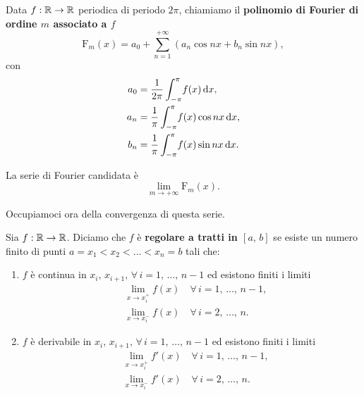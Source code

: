 \documentclass[../../analisi2]{subfiles}
\begin{document}
        \begin{definizione}
            Data \(f : \mathbb{R} \to \mathbb{R}\) periodica di periodo \(2\pi\), chiamiamo il \textbf{polinomio di Fourier di ordine \(m\) associato a
            \(f\)}
            \[
                \mathrm{F}_m (x) = a_0 + \sum_{n = 1}^{+\infty} \left(a_n \cos nx + b_n \sin nx\right),
            \]
            con
            \begin{align*}
                a_0 &= \frac{1}{2\pi} \int_{-\pi}^{\pi} \! f(x) \, \mathrm{d}x,\\
                a_n &= \frac{1}{\pi} \int_{-\pi}^{\pi} \! f(x) \cos nx \, \mathrm{d}x,\\
                b_n &= \frac{1}{\pi} \int_{-\pi}^{\pi} \! f(x) \sin nx \, \mathrm{d}x.
            \end{align*}

            La serie di Fourier candidata è
            \[
                \lim_{m \to +\infty} \mathrm{F}_m (x).
            \]
        \end{definizione}

        Occupiamoci ora della convergenza di questa serie.

        \begin{definizione}
            Sia \(f : \mathbb{R} \to \mathbb{R}\). Diciamo che \(f\) è \textbf{regolare a tratti in \([a, \, b]\)} se esiste un numero finito di punti
            \(a = x_1 < x_2 < \ldots < x_n = b\) tali che:
            \begin{enumerate}
                \item \(f\) è continua in \(x_i, \, x_{i + 1}, \, \forall \, i = 1, \, \ldots, \, n - 1\) ed esistono finiti i limiti
                    \begin{align*}
                        &\lim_{x \to x_i^+} f(x) \quad \forall \, i = 1, \, \ldots, \, n - 1,\\
                        &\lim_{x \to x_i^-} f(x) \quad \forall \, i = 2, \, \ldots, \, n.
                    \end{align*}
                \item \(f\) è derivabile in \(x_i, \, x_{i + 1}, \, \forall \, i = 1, \, \ldots, \, n - 1\) ed esistono finiti i limiti
                    \begin{align*}
                        &\lim_{x \to x_i^+} f'(x) \quad \forall \, i = 1, \, \ldots, \, n - 1,\\
                        &\lim_{x \to x_i^-} f'(x) \quad \forall \, i = 2, \, \ldots, \, n.
                    \end{align*}
            \end{enumerate}
        \end{definizione}
\end{document}
